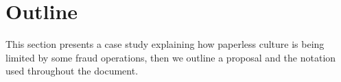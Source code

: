 \section{Outline}
\label{sec:outline}
This section presents a case study explaining how
paperless culture is being limited by some fraud 
operations, then we outline a proposal and the notation used
throughout the document.



